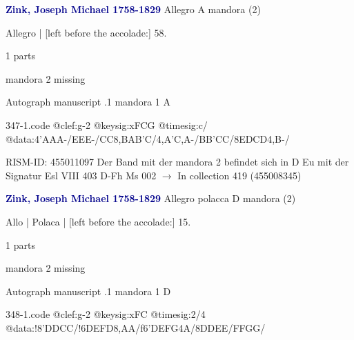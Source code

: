 \documentclass[twocolumn]{book}
\begin{document}
\newline \par \vspace{7pt} \textcolor{darkblue}{\textbf{Zink, Joseph Michael  1758-1829}}
\newline Allegro  A  
\newline mandora (2)
\newline \begin{itshape}[f.30v, at left:] Allegro | [left before the accolade:] 58.\end{itshape} 
\newline \textcolor{darkblue}{}  1 parts  
\newline \begin{small} mandora 2 missing\end{small} 
\newline Autograph manuscript
.1  mandora 1  A  
\begin{filecontents*}{347-1.code}
@clef:g-2
@keysig:xFCG
@timesig:c/
@data:4'AAA-/EEE-/CC8,BAB'C/4,A'C,A-/BB'CC/8EDCD4,B-/
\end{filecontents*}
\newline
%

\newline RISM-ID: 455011097
\newline Der Band mit der mandora 2 befindet sich in D Eu mit der Signatur Esl VIII 403
\newline D-Fh  Ms 002
\newline $\rightarrow$ In collection 419 (455008345)

\newline \par \vspace{7pt} \textcolor{darkblue}{\textbf{Zink, Joseph Michael  1758-1829}}
\newline Allegro polacca  D  
\newline mandora (2)
\newline \begin{itshape}[f.11v, at left:] Allo | Polaca | [left before the accolade:] 15.\end{itshape} 
\newline \textcolor{darkblue}{}  1 parts  
\newline \begin{small} mandora 2 missing\end{small} 
\newline Autograph manuscript
.1  mandora 1  D  
\begin{filecontents*}{348-1.code}
@clef:g-2
@keysig:xFC
@timesig:2/4
@data:!8'DDCC/!6DEFD{8,AA}/f6'DEFG4A/8DDEE/FFGG/
\end{filecontents*}
\newline
%
\end{document}
